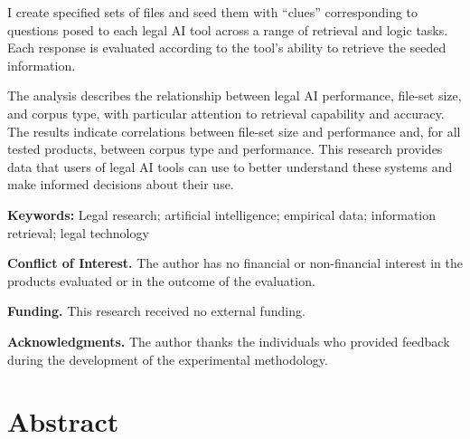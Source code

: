 \documentclass[
]{article}
\begin{document}
\begin{titlepage}
\begin{footnotesize}
I create specified sets of files and seed them with ``clues'' corresponding to questions posed to each legal AI tool across a range of retrieval and logic tasks. Each response is evaluated according to the tool's ability to retrieve the seeded information.

The analysis describes the relationship between legal AI performance, file-set size, and corpus type, with particular attention to retrieval capability and accuracy. The results indicate correlations between file-set size and performance and, for all tested products, between corpus type and performance. This research provides data that users of legal AI tools can use to better understand these systems and make informed decisions about their use.

\end{footnotesize}

\vspace{0.075in}

\noindent
{\small
\textbf{Keywords:}
Legal research; artificial intelligence; empirical data; information retrieval; legal technology
}

\vspace{0.15in}

\begin{footnotesize}

\noindent
\textbf{Conflict of Interest.}
The author has no financial or non-financial interest in the products evaluated or in the outcome of the evaluation.

\vspace{0.055in}

\noindent
\textbf{Funding.}
This research received no external funding.

\vspace{0.055in}

\noindent
\textbf{Acknowledgments.}
The author thanks the individuals who provided feedback during the development of the experimental methodology.

\end{footnotesize}

\restoregeometry
\end{titlepage}

\setcounter{page}{1}

{
\setcounter{tocdepth}{3}
\tableofcontents

\clearpage
{}
\setcounter{page}{1}


}
\section{Abstract}\label{abstract}
\end{document}
